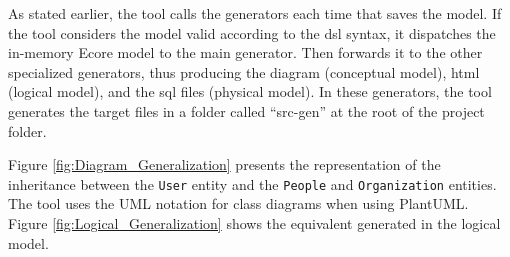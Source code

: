 As stated earlier, the tool calls the generators each time that saves the model.
If the tool considers the model valid according to the \ac{dsl} syntax, it dispatches the in-memory Ecore model to the main generator. Then forwards it to the other specialized generators, thus producing the diagram (conceptual model), \ac{html} (logical model), and the \ac{sql} files (physical model).
In these generators, the tool generates the target files in a folder called ``src-gen'' at the root of the project folder.

Figure \ref{fig:Diagram_Generalization} presents the representation of the inheritance between the \texttt{User} entity and the \texttt{People} and \texttt{Organization} entities.
The tool uses the UML notation for class diagrams when using PlantUML.
Figure \ref{fig:Logical_Generalization} shows the equivalent generated in the logical model.

